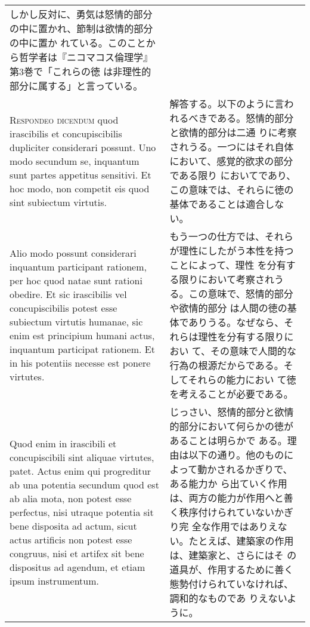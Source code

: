 \documentclass[10pt]{jsarticle}
\begin{document}
\begin{longtable}{p{21em}p{21em}}
しかし反対に、勇気は怒情的部分の中に置かれ、節制は欲情的部分の中に置か
れている。このことから哲学者は『ニコマコス倫理学』第3巻で「これらの徳
は非理性的部分に属する」と言っている。

\\

{\scshape Respondeo dicendum} quod irascibilis et concupiscibilis
dupliciter considerari possunt. Uno modo secundum se, inquantum sunt
partes appetitus sensitivi. Et hoc modo, non competit eis quod sint
subiectum virtutis.

&

解答する。以下のように言われるべきである。怒情的部分と欲情的部分は二通
りに考察されうる。一つにはそれ自体において、感覚的欲求の部分である限り
においてであり、この意味では、それらに徳の基体であることは適合しない。

\\

Alio modo possunt considerari inquantum participant rationem, per hoc
quod natae sunt rationi obedire. Et sic irascibilis vel
concupiscibilis potest esse subiectum virtutis humanae, sic enim est
principium humani actus, inquantum participat rationem. Et in his
potentiis necesse est ponere virtutes.

&

もう一つの仕方では、それらが理性にしたがう本性を持つことによって、理性
を分有する限りにおいて考察されうる。この意味で、怒情的部分や欲情的部分
は人間の徳の基体でありうる。なぜなら、それらは理性を分有する限りにおい
て、その意味で人間的な行為の根源だからである。そしてそれらの能力におい
て徳を考えることが必要である。

\\

Quod enim in irascibili et concupiscibili sint aliquae virtutes,
patet. Actus enim qui progreditur ab una potentia secundum quod est ab
alia mota, non potest esse perfectus, nisi utraque potentia sit bene
disposita ad actum, sicut actus artificis non potest esse congruus,
nisi et artifex sit bene dispositus ad agendum, et etiam ipsum
instrumentum.

&

じっさい、怒情的部分と欲情的部分において何らかの徳があることは明らかで
ある。理由は以下の通り。他のものによって動かされるかぎりで、ある能力か
ら出ていく作用は、両方の能力が作用へと善く秩序付けられていないかぎり完
全な作用ではありえない。たとえば、建築家の作用は、建築家と、さらにはそ
の道具が、作用するために善く態勢付けられていなければ、調和的なものであ
りえないように。


\end{longtable}
\end{document}
